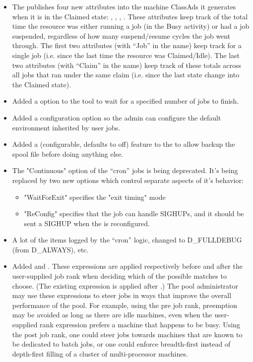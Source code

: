 \begin{itemize}
\item The  publishes four new attributes into the
  machine ClassAds it generates when it is in the Claimed state:
  , ,
  , .
  These attributes keep track of the total time the resource was
  either running a job (in the Busy activity) or had a job suspended,
  regardless of how many suspend/resume cycles the job went through.
  The first two attributes (with ``Job'' in the name) keep track for a
  single job (i.e. since the last time the resource was
  Claimed/Idle). 
  The last two attributes (with ``Claim'' in the name) keep track of
  these totals across all jobs that ran under the same claim
  (i.e. since the last state change into the Claimed state).

\item Added a  option to the  tool to wait for
   a specified number of jobs to finish.

\item Added a configuration option 
   so the admin can configure the default environment inherited by
   user jobs.

\item Added a (configurable, defaults to off) feature to the 
   to allow backup the spool file before doing anything else.

\item The "Continuous" option of the  ``cron'' jobs is
being deprecated.   It's being replaced by two new options which
control separate aspects of it's behavior:
\begin{itemize}
\item "WaitForExit" specifies the "exit timing" mode
\item "ReConfig" specifies that the job can handle SIGHUPs, and it should 
be sent a SIGHUP when the  is reconfigured.
\end{itemize}

\item A lot of the items logged by the  ``cron'' logic,
changed to D\_FULLDEBUG (from D\_ALWAYS), etc.

\item Added  and
.  These expressions are applied
respectively before and after the user-supplied job rank when deciding
which of the possible matches to choose.  (The existing expression
 is applied after
.)  The pool administrator may use
these expressions to steer jobs in ways that improve the overall
performance of the pool.  For example, using the pre job rank,
preemption may be avoided as long as there are idle machines, even
when the user-supplied rank expression prefers a machine that happens
to be busy.  Using the post job rank, one could steer jobs towards
machines that are known to be dedicated to batch jobs, or one could
enforce breadth-first instead of depth-first filling of a cluster of
multi-processor machines.


\end{itemize}
